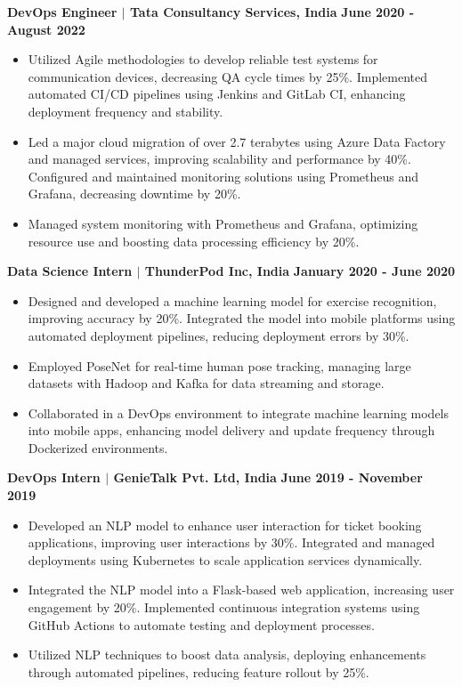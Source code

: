 \documentclass{article}
\begin{document}
\noindent \textbf{DevOps Engineer $\mid$ Tata Consultancy Services, India}  \hfill \textbf{June 2020 - August 2022}
\begin{itemize}[noitemsep,nolistsep,leftmargin=*]
\item {\small Utilized Agile methodologies to develop reliable test systems for communication devices, decreasing QA cycle times by 25\%. Implemented automated CI/CD pipelines using Jenkins and GitLab CI, enhancing deployment frequency and stability.}
\item {\small Led a major cloud migration of over 2.7 terabytes using Azure Data Factory and managed services, improving scalability and performance by 40\%. Configured and maintained monitoring solutions using Prometheus and Grafana, decreasing downtime by 20\%.}
\item {\small Managed system monitoring with Prometheus and Grafana, optimizing resource use and boosting data processing efficiency by 20\%.}
\end{itemize}
\vspace{2mm} 
\noindent \textbf{Data Science Intern $\mid$ ThunderPod Inc, India}  \hfill \textbf{January 2020 - June 2020}
\begin{itemize}[noitemsep,nolistsep,leftmargin=*]
\item {\small Designed and developed a machine learning model for exercise recognition, improving accuracy by 20\%. Integrated the model into mobile platforms using automated deployment pipelines, reducing deployment errors by 30\%.}
\item {\small Employed PoseNet for real-time human pose tracking, managing large datasets with Hadoop and Kafka for data streaming and storage.}
\item {\small Collaborated in a DevOps environment to integrate machine learning models into mobile apps, enhancing model delivery and update frequency through Dockerized environments.}
\end{itemize}
\vspace{2mm} 
\noindent \textbf{DevOps Intern $\mid$ GenieTalk Pvt. Ltd, India}  \hfill \textbf{June 2019 - November 2019}
\begin{itemize}[noitemsep,nolistsep,leftmargin=*]
\item {\small Developed an NLP model to enhance user interaction for ticket booking applications, improving user interactions by 30\%. Integrated and managed deployments using Kubernetes to scale application services dynamically.}
\item {\small Integrated the NLP model into a Flask-based web application, increasing user engagement by 20\%. Implemented continuous integration systems using GitHub Actions to automate testing and deployment processes.}
\item {\small Utilized NLP techniques to boost data analysis, deploying enhancements through automated pipelines, reducing feature rollout by 25\%.}
\end{itemize}
\end{document}

